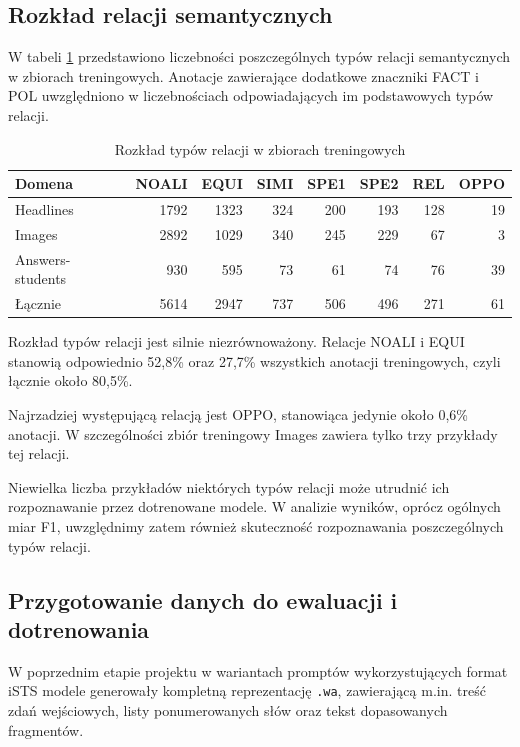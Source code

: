 \documentclass[a4paper,10pt]{article}
\begin{document}
\subsection{Rozkład relacji semantycznych}

W tabeli \ref{tab:label_distribution} przedstawiono
liczebności poszczególnych typów relacji semantycznych
w zbiorach treningowych. Anotacje zawierające dodatkowe
znaczniki FACT i POL uwzględniono w liczebnościach
odpowiadających im podstawowych typów relacji.

\begin{table}[htbp]
    \centering
    \caption{Rozkład typów relacji w zbiorach treningowych}
    \label{tab:label_distribution}
    \begin{tabular}{lrrrrrrr}
        \toprule
        Domena & NOALI & EQUI & SIMI & SPE1
        & SPE2 & REL & OPPO \\
        \midrule
        Headlines        & 1792 & 1323 & 324 & 200 & 193 & 128 & 19 \\
        Images           & 2892 & 1029 & 340 & 245 & 229 & 67  & 3  \\
        Answers-students & 930  & 595  & 73  & 61  & 74  & 76  & 39 \\
        \midrule
        Łącznie          & 5614 & 2947 & 737 & 506 & 496 & 271 & 61 \\
        \bottomrule
    \end{tabular}
\end{table}

Rozkład typów relacji jest silnie niezrównoważony.
Relacje NOALI i EQUI stanowią odpowiednio 52,8\%
oraz 27,7\% wszystkich anotacji treningowych,
czyli łącznie około 80,5\%.

Najrzadziej występującą relacją jest OPPO, stanowiąca
jedynie około 0,6\% anotacji. W szczególności zbiór
treningowy Images zawiera tylko trzy przykłady tej
relacji.

Niewielka liczba przykładów niektórych typów relacji
może utrudnić ich rozpoznawanie przez dotrenowane
modele. W analizie wyników, oprócz ogólnych miar F1,
uwzględnimy zatem również skuteczność rozpoznawania
poszczególnych typów relacji.

\subsection{Przygotowanie danych do ewaluacji i dotrenowania}

W poprzednim etapie projektu \cite{jacyna} w wariantach
promptów wykorzystujących format iSTS modele generowały
kompletną reprezentację \texttt{.wa}, zawierającą
m.in. treść zdań wejściowych, listy ponumerowanych
słów oraz tekst dopasowanych fragmentów.
\end{document}
